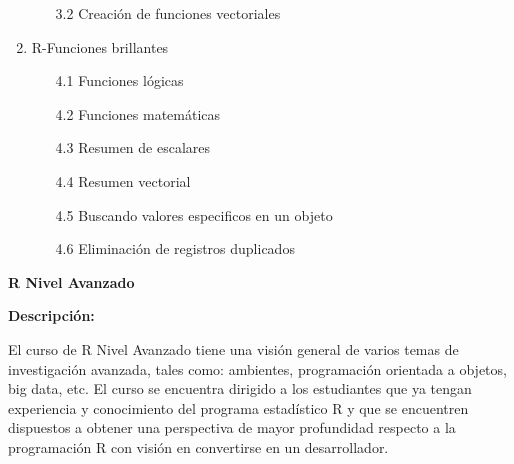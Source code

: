 \documentclass[12pt,a4paper,oneside]{article}\usepackage[]{graphicx}\usepackage[]{color}
\begin{document}
\begin{enumerate}
\begin{enumerate}
      \item[3.2]{Creación de funciones vectoriales}
   \end{enumerate}
   \item{R-Funciones brillantes}
   \begin{enumerate}
      \item[4.1]{Funciones lógicas}
      \item[4.2]{Funciones matemáticas}
      \item[4.3]{Resumen de escalares}
      \item[4.4]{Resumen vectorial}
      \item[4.5]{Buscando valores especificos en un objeto}
      \item[4.6]{Eliminación de registros duplicados}
   \end{enumerate}
\end{enumerate}



\newpage

\begin{center}
{\bf \Large R Nivel Avanzado}
\end{center}

{\bf \large Descripción:}\newline

El curso de R Nivel Avanzado tiene una visión general de varios temas de investigación avanzada, tales como: ambientes, programación orientada a objetos, big data, etc. El curso se encuentra dirigido a los estudiantes que ya tengan experiencia y conocimiento del programa estadístico R y que se encuentren dispuestos a obtener una perspectiva de mayor profundidad respecto a la programación R con visión en convertirse en un desarrollador.\newline

  
\end{document}
